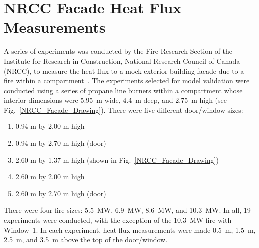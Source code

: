 \clearpage

\section{NRCC Facade Heat Flux Measurements}

A series of experiments was conducted by the Fire Research Section of the Institute for Research in Construction, National Research Council of Canada (NRCC), to measure the heat flux to a mock exterior building facade due to a fire within a compartment~\cite{Oleszkiewicz:ASME,Oleszkiewicz:FireTech}. The experiments selected for model validation were conducted using a series of propane line burners within a compartment whose interior dimensions were 5.95~m wide, 4.4~m deep, and 2.75~m high (see Fig.~\ref{NRCC_Facade_Drawing}). There were five different door/window sizes:
\begin{enumerate}
\item 0.94 m by 2.00 m high
\item 0.94 m by 2.70 m high (door)
\item 2.60 m by 1.37 m high (shown in Fig.~\ref{NRCC_Facade_Drawing})
\item 2.60 m by 2.00 m high
\item 2.60 m by 2.70 m high (door)
\end{enumerate}
There were four fire sizes: 5.5~MW, 6.9~MW, 8.6~MW, and 10.3~MW. In all, 19 experiments were conducted, with the exception of the 10.3~MW fire with Window~1. In each experiment, heat flux measurements were made 0.5~m, 1.5~m, 2.5~m, and 3.5~m above the top of the door/window.

